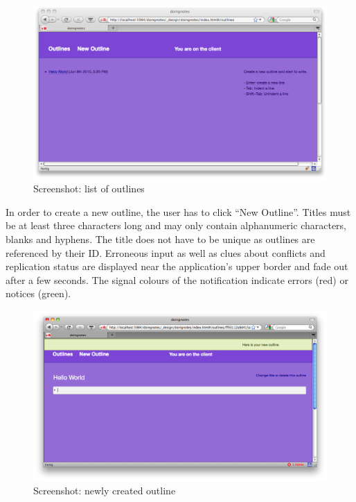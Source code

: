 \medskip
\begin{figure}[ht] 
  \begin{center}
    \includegraphics[width=\textwidth]{grafik/screenshot-outline-list} 
  \end{center}
  \caption{Screenshot: list of outlines}
  \label{fig:outline-list} 
\end{figure}

In order to create a new outline, the user has to click \enquote{New Outline}. Titles must be at least three characters long and may only contain alphanumeric characters, blanks and hyphens. The title does not have to be unique as outlines are referenced by their ID. Erroneous input as well as clues about conflicts and replication status are displayed near the application's upper border and fade out after a few seconds. The signal colours of the notification indicate errors (red) or notices (green).

\medskip
\begin{figure}[ht] 
  \begin{center}
    \includegraphics[width=\textwidth]{grafik/screenshot-new-outline} 
  \end{center}
  \caption{Screenshot: newly created outline}
  \label{fig:new-outline} 
\end{figure}

